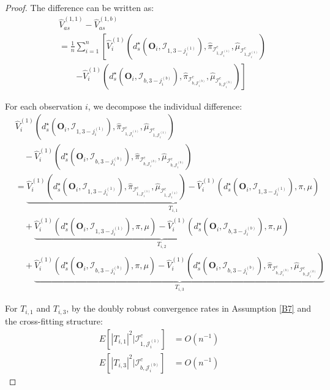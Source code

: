 \documentclass[11pt]{article}
\theoremstyle{referenceplain}
\theoremstyle{referencedefinition}
\theoremstyle{referenceremark}
\begin{document}
\begin{proof}
The difference can be written as:
\begin{align*}
    &\widehat{V}_{as}^{(1,1)} - \widehat{V}_{as}^{(1,b)}\\
    &= \frac{1}{n}\sum_{i=1}^n \left[\widehat{V}_i^{(1)}(d_s^\star(\mathbf{O}_i,\mathcal{I}_{1,3-j_i^{(1)}}),\widehat{\pi}_{\mathcal{I}_{1,\mathcal{J}_i^{(1)}}^c},\widehat{\mu}_{\mathcal{I}_{1,\mathcal{J}_i^{(1)}}^c})\right.\\
    &\quad\quad\left. - \widehat{V}_i^{(1)}(d_s^\star(\mathbf{O}_i,\mathcal{I}_{b,3-j_i^{(b)}}),\widehat{\pi}_{\mathcal{I}_{b,\mathcal{J}_i^{(b)}}^c},\widehat{\mu}_{\mathcal{I}_{b,\mathcal{J}_i^{(b)}}^c})\right]
\end{align*}

For each observation $i$, we decompose the individual difference:
\begin{align*}
    &\widehat{V}_i^{(1)}(d_s^\star(\mathbf{O}_i,\mathcal{I}_{1,3-j_i^{(1)}}),\widehat{\pi}_{\mathcal{I}_{1,\mathcal{J}_i^{(1)}}^c},\widehat{\mu}_{\mathcal{I}_{1,\mathcal{J}_i^{(1)}}^c})\\
    &\quad - \widehat{V}_i^{(1)}(d_s^\star(\mathbf{O}_i,\mathcal{I}_{b,3-j_i^{(b)}}),\widehat{\pi}_{\mathcal{I}_{b,\mathcal{J}_i^{(b)}}^c},\widehat{\mu}_{\mathcal{I}_{b,\mathcal{J}_i^{(b)}}^c})\\
    &= \underbrace{\widehat{V}_i^{(1)}(d_s^\star(\mathbf{O}_i,\mathcal{I}_{1,3-j_i^{(1)}}),\widehat{\pi}_{\mathcal{I}_{1,\mathcal{J}_i^{(1)}}^c},\widehat{\mu}_{\mathcal{I}_{1,\mathcal{J}_i^{(1)}}^c}) - \widehat{V}_i^{(1)}(d_s^\star(\mathbf{O}_i,\mathcal{I}_{1,3-j_i^{(1)}}),\pi,\mu)}_{T_{i,1}}\\
    &\quad + \underbrace{\widehat{V}_i^{(1)}(d_s^\star(\mathbf{O}_i,\mathcal{I}_{1,3-j_i^{(1)}}),\pi,\mu) - \widehat{V}_i^{(1)}(d_s^\star(\mathbf{O}_i,\mathcal{I}_{b,3-j_i^{(b)}}),\pi,\mu)}_{T_{i,2}}\\
    &\quad + \underbrace{\widehat{V}_i^{(1)}(d_s^\star(\mathbf{O}_i,\mathcal{I}_{b,3-j_i^{(b)}}),\pi,\mu) - \widehat{V}_i^{(1)}(d_s^\star(\mathbf{O}_i,\mathcal{I}_{b,3-j_i^{(b)}}),\widehat{\pi}_{\mathcal{I}_{b,\mathcal{J}_i^{(b)}}^c},\widehat{\mu}_{\mathcal{I}_{b,\mathcal{J}_i^{(b)}}^c})}_{T_{i,3}}
\end{align*}

For $T_{i,1}$ and $T_{i,3}$, by the doubly robust convergence rates in Assumption \ref{B7} and the cross-fitting structure:
\begin{align*}
    E[|T_{i,1}|^2 | \mathcal{I}_{1,\mathcal{J}_i^{(1)}}^c] &= O(n^{-1})\\
    E[|T_{i,3}|^2 | \mathcal{I}_{b,\mathcal{J}_i^{(b)}}^c] &= O(n^{-1})
\end{align*}


\end{proof}
\end{document}
